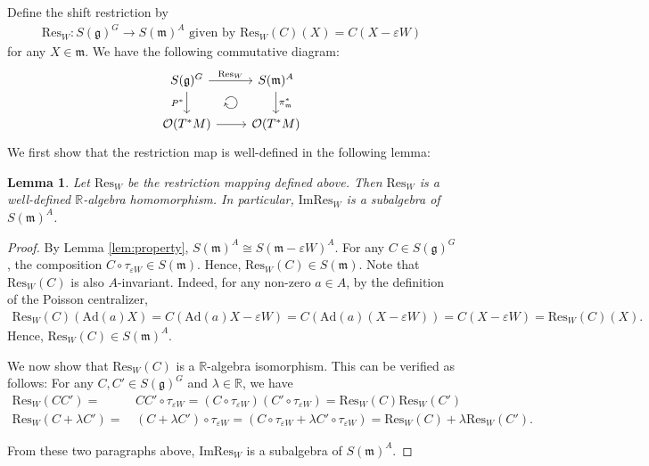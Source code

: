 \documentclass[11pt]{amsart}
\newtheorem{lemma}[theorem]{Lemma}
\theoremstyle{definition}
\theoremstyle{plain}
\theoremstyle{conclusion}
\begin{document}
 Define the shift restriction by \begin{align}
     \mathrm{Res}_W: S(\mathfrak{g})^G \longrightarrow S(\mathfrak{m})^A  \text{ given by } \mathrm{Res}_W(C) (X) = C(X - \varepsilon W)
 \end{align}  for any $X \in \mathfrak{m}$. We have the following commutative diagram:   \[\begin{tikzcd}
	{S(\mathfrak{g})^G } & {S(\mathfrak{m})^A} \\
	{\mathcal{O}(T^*M)} & {\mathcal{O}(T^*M)}
	\arrow["{\mathrm{Res}_W}", from=1-1, to=1-2]
	\arrow["{P^*}"', from=1-1, to=2-1]
	\arrow["{\pi_\mathfrak{m}^*}", from=1-2, to=2-2]
	\arrow[from=2-1, to=2-2]
    \arrow[from=1-1, to=2-2, phantom, "\circlearrowright" {anchor=center, scale=1.5, rotate=90}]
\end{tikzcd}\] 
We first show that the restriction map is well-defined in the following lemma: \begin{lemma}
    \label{lem:welldefineres}
Let $\mathrm{Res}_W$ be the restriction mapping defined above. Then $\mathrm{Res}_W$ is a well-defined $\mathbb{R}$-algebra homomorphism. In particular, $\mathrm{Im Res}_W $ is a subalgebra of $S(\mathfrak{m})^A$.
\end{lemma}
\begin{proof}
    By Lemma \ref{lem:property}, $S(\mathfrak{m})^A \cong S(\mathfrak{m} - \varepsilon W)^A$. For any $C \in S(\mathfrak{g})^G$, the composition $C \circ \tau_{\varepsilon W} \in S(\mathfrak{m})$. Hence, $\mathrm{Res}_W(C) \in S(\mathfrak{m})$. Note that $\mathrm{Res}_W(C)  $ is also $A$-invariant. Indeed, for any non-zero $a \in A$, by the definition of the Poisson centralizer, \begin{align*}
    \mathrm{Res}_W(C)(\mathrm{Ad}(a)X) = C(\mathrm{Ad}(a)X - \varepsilon W) = C(\mathrm{Ad}(a)(X -\varepsilon W)) = C(X - \varepsilon W) = \mathrm{Res}_W(C)( X).
\end{align*} Hence, $  \mathrm{Res}_W(C) \in S(\mathfrak{m})^A$.

We now show that $ \mathrm{Res}_W(C)$ is a $\mathbb{R}$-algebra isomorphism. This can be verified as follows: For any $C,C' \in S(\mathfrak{g})^G$ and $\lambda \in \mathbb{R}$, we have \begin{align*}
     \mathrm{Res}_W(CC') = & \, C C' \circ \tau_{\varepsilon W} = \left(C \circ \tau_{\varepsilon W} \right) \left( C' \circ \tau_{\varepsilon W} \right) =\mathrm{Res}_W(C)\mathrm{Res}_W(C')  \\
       \mathrm{Res}_W(C+\lambda C') = & \,(C+\lambda C') \circ \tau_{\varepsilon W} = \left(C \circ \tau_{\varepsilon W}  + \lambda C' \circ \tau_{\varepsilon W} \right)  = \mathrm{Res}_W(C) + \lambda \mathrm{Res}_W(C').
\end{align*}

From these two paragraphs above, $\mathrm{Im Res}_W$ is a subalgebra of $S(\mathfrak{m})^A$.
\end{proof}
\end{document}
